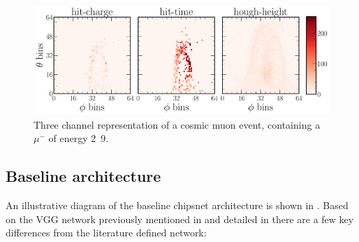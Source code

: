 \begin{figure} %
    \includegraphics[width=\textwidth]{diagrams/7-results/explore_cosmic_event.pdf}
    \caption[Example of a cosmic muon event]
    {Three channel representation of a cosmic muon event, containing a $\mu^{-}$ of energy
        \unit{2.9}{\GeV}.}
    \label{fig:explore_cosmic_event}
\end{figure}

\subsection{Baseline architecture} %
\label{sec:cnn_baseline_arch} %

An illustrative diagram of the baseline chipsnet architecture is shown in
. Based on the VGG network previously mentioned in
 and detailed in  there are a few key
differences from the literature defined network:

